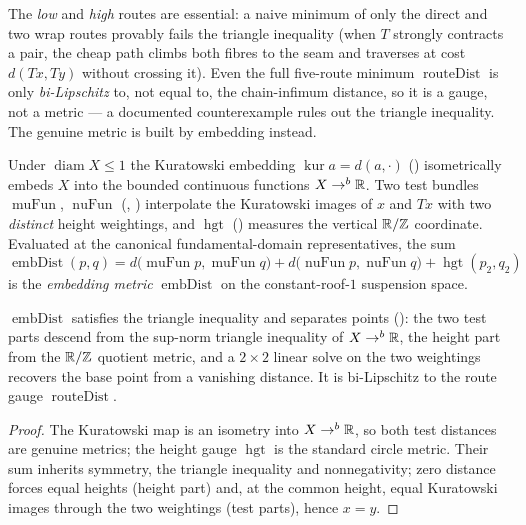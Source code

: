 \begin{proposition}\label{routeDist_not_metric}
  \leanok
  The \emph{low} and \emph{high} routes are essential: a naive minimum of only the direct and two
  wrap routes provably fails the triangle inequality (when $T$ strongly contracts a pair, the cheap
  path climbs both fibres to the seam and traverses at cost $d(Tx, Ty)$ without crossing it). Even the
  full five-route minimum $\operatorname{routeDist}$ is only \emph{bi-Lipschitz} to, not equal to, the
  chain-infimum distance, so it is a gauge, not a metric --- a documented counterexample rules out
  the triangle inequality. The genuine metric is built by embedding instead.
\end{proposition}

\begin{definition}\label{embDist}
  \leanok
  Under $\operatorname{diam} X \le 1$ the Kuratowski embedding $\operatorname{kur} a = d(a, \cdot)$
  () isometrically embeds $X$ into the bounded continuous functions
  $X \to^{b} \mathbb{R}$. Two test bundles $\operatorname{muFun}$, $\operatorname{nuFun}$
  (, ) interpolate the Kuratowski images of $x$
  and $Tx$ with two \emph{distinct} height weightings, and $\operatorname{hgt}$
  () measures the vertical $\mathbb{R}/\mathbb{Z}$ coordinate. Evaluated at the canonical
  fundamental-domain representatives, the sum
  \[
    \operatorname{embDist}(p, q) = d\bigl(\operatorname{muFun} p, \operatorname{muFun} q\bigr)
      + d\bigl(\operatorname{nuFun} p, \operatorname{nuFun} q\bigr)
      + \operatorname{hgt}(p_2, q_2)
  \]
  is the \emph{embedding metric} $\operatorname{embDist}$ on the constant-roof-$1$ suspension space.
\end{definition}

\begin{theorem}\label{embDist_triangle}
  \leanok
  $\operatorname{embDist}$ satisfies the triangle inequality and separates points
  (): the two test parts descend from the sup-norm triangle
  inequality of $X \to^{b} \mathbb{R}$, the height part from the $\mathbb{R}/\mathbb{Z}$ quotient metric, and a $2\times 2$
  linear solve on the two weightings recovers the base point from a vanishing distance. It is
  bi-Lipschitz to the route gauge $\operatorname{routeDist}$.
\end{theorem}
\begin{proof}\leanok
  The Kuratowski map is an isometry into $X \to^{b} \mathbb{R}$, so both test distances are genuine metrics;
  the height gauge $\operatorname{hgt}$ is the standard circle metric. Their sum inherits symmetry, the
  triangle inequality and nonnegativity; zero distance forces equal heights (height part) and, at the
  common height, equal Kuratowski images through the two weightings (test parts), hence $x = y$.
\end{proof}


